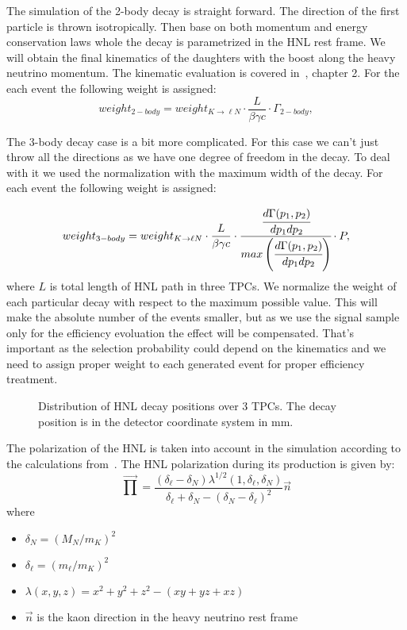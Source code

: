 \documentclass[../main.tex]{subfiles}
\begin{document}
The simulation of the 2-body decay is straight forward. The direction of the first particle is thrown isotropically. Then base on both momentum and energy conservation laws whole the decay is parametrized in the HNL rest frame. We will obtain the final kinematics of the daughters with the boost along the heavy neutrino momentum. The kinematic evaluation is covered in~\cite{Landau2013}, chapter 2. For the each event the following weight is assigned:
\begin{equation}
    weight_{2-body}=weight_{K\rightarrow \ell N}\cdot\frac{L}{\beta\gamma c}\cdot\Gamma_{2-body},
\end{equation}

The 3-body decay case is a bit more complicated. For this case we can't just throw all the directions as we have one degree of freedom in the decay. To deal with it we used the normalization with the maximum width of the decay. For each event the following weight is assigned:

\begin{equation}
    weight_{3-body}=weight_{K\rightarrow \ell N}\cdot\frac{L}{\beta\gamma c}\cdot\cfrac{\cfrac{d\Gamma(p_1,p_2)}{dp_1dp_2}}{max\left(\cfrac{d\Gamma(p_1,p_2)}{dp_1dp_2}\right)}\cdot P,
\end{equation}
where $L$ is total length of HNL path in three TPCs. We normalize the weight of each particular decay with respect to the maximum possible value. This will make the absolute number of the events smaller, but as we use the signal sample only for the efficiency evoluation the effect will be compensated. That's important as the selection probability could depend on the kinematics and we need to assign proper weight to each generated event for proper efficiency treatment.

\begin{figure}[!ht]
    \caption{Distribution of HNL decay positions over 3 TPCs. The decay position is in the detector coordinate system in mm.}
    \label{fig:HNL:decayPos}
\end{figure}

 The polarization of the HNL is taken into account in the simulation according to the calculations from~\cite{Abgrall2014}. The HNL polarization during its production is given by:
 \begin{equation}
    \overrightarrow\prod=\frac{\left(\delta_\ell-\delta_{N}\right)\lambda^{1/2}\left(1,\delta_\ell, \delta_{N}\right)}{\delta_\ell+\delta_{N}-\left(\delta_{N}-\delta_\ell\right)^2}\overrightarrow{n}
 \end{equation}
where
\begin{itemize}
    \item $\delta_{N}=\left(M_{N}/m_K\right)^2$
    \item $\delta_\ell=\left(m_\ell/m_K\right)^2$
    \item $\lambda\left(x, y, z\right)=x^2+y^2+z^2-\left(xy+yz+xz\right)$
    \item $\overrightarrow{n}$ is the kaon direction in the heavy neutrino rest frame
\end{itemize}
\end{document}

